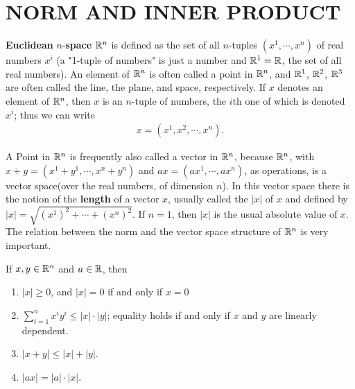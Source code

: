 \section[\textsc{norm and inner product}]{NORM AND INNER PRODUCT}
\textbf{Euclidean} $n$-\textbf{space} $\mathbb{R}^n$ is defined as the set of all
$n$-tuples $(x^1,\cdots,x^n)$ of real numbers $x^i$ (a "1-tuple of numbers" is 
just a number and $\mathbb{R}^1 = \mathbb{R}$, the set of all real numbers). 
An element of $\mathbb{R}^n$ is often called a point in $\mathbb{R}^n$, and $\mathbb{R}^1$, $\mathbb{R}^2$, $\mathbb{R}^3$
are often called the line, the plane, and space, respectively. 
If $x$ denotes an element of $\mathbb{R}^n$, then $x$ is an $n$-tuple of numbers, the
$i$th one of which is denoted $x^i$; thus we can write 
\begin{align*}
  x = (x^1, x^2, \cdots, x^n).
\end{align*}

A Point in $\mathbb{R}^n$ is frequently also called a vector in $\mathbb{R}^n$,
because $\mathbb{R}^n$, with $x+y = (x^1+y^1, \cdots, x^n+y^n)$ and $ax=(ax^1, \cdots, ax^n)$,
as operations, is a vector space(over the real numbers, of dimension $n$).
In this vector space there is the notion of the \textbf{length} of a vector $x$, usually 
called the  $|x|$ of $x$ and 
defined by $|x| = \sqrt{(x^1)^2 +\cdots + (x^n)^2}$. If $n=1$, then $|x|$ is the usual absolute 
value of $x$. The relation between the norm and the vector space structure of $\mathbb{R}^n$ is very 
important.

\begin{theorem}
  If $x, y \in \mathbb{R}^n$ and $a\in \mathbb{R}$, then 
  \begin{enumerate}[label={\upshape(\arabic*)}]
      \item $|x| \ge 0$, and $|x| = 0$ if and only if $x=0$ 
      \item $\sum_{i=1}^{n }{x^iy^i} \le |x|\cdot |y|$; equality holds if and only if 
        $x$ and $y$ are linearly dependent.
      \item $|x+y| \le |x| + |y|$.
      \item $|ax| = |a|\cdot |x|$.
  \end{enumerate}
\end{theorem}

